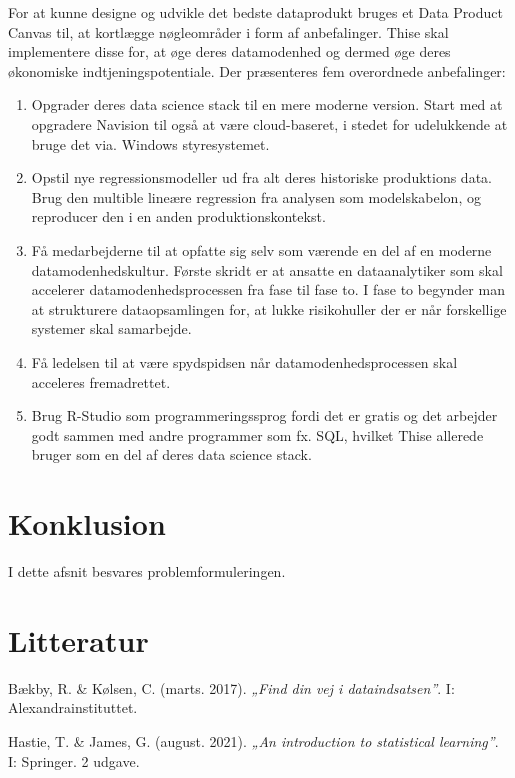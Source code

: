 \documentclass[
  12pt,
  a4paper,
  DIV=11,
  numbers=noendperiod,
  oneside,
  open=any]{scrartcl}
\providecommand{\tightlist}{%
  \setlength{\itemsep}{0pt}\setlength{\parskip}{0pt}}\usepackage{longtable,booktabs,array}
\begin{document}
For at kunne designe og udvikle det bedste dataprodukt bruges et Data
Product Canvas til, at kortlægge nøgleområder i form af anbefalinger.
Thise skal implementere disse for, at øge deres datamodenhed og dermed
øge deres økonomiske indtjeningspotentiale. Der præsenteres fem
overordnede anbefalinger:

\begin{enumerate}
\def\labelenumi{\arabic{enumi}.}
\tightlist
\item
  Opgrader deres data science stack til en mere moderne version. Start
  med at opgradere Navision til også at være cloud-baseret, i stedet for
  udelukkende at bruge det via. Windows styresystemet.
\item
  Opstil nye regressionsmodeller ud fra alt deres historiske produktions
  data. Brug den multible lineære regression fra analysen som
  modelskabelon, og reproducer den i en anden produktionskontekst.
\item
  Få medarbejderne til at opfatte sig selv som værende en del af en
  moderne datamodenhedskultur. Første skridt er at ansatte en
  dataanalytiker som skal accelerer datamodenhedsprocessen fra fase til
  fase to. I fase to begynder man at strukturere dataopsamlingen for, at
  lukke risikohuller der er når forskellige systemer skal samarbejde.
\item
  Få ledelsen til at være spydspidsen når datamodenhedsprocessen skal
  acceleres fremadrettet.
\item
  Brug R-Studio som programmeringssprog fordi det er gratis og det
  arbejder godt sammen med andre programmer som fx. SQL, hvilket Thise
  allerede bruger som en del af deres data science stack.
\end{enumerate}

\hypertarget{konklusion}{%
\section{Konklusion}\label{konklusion}}

I dette afsnit besvares problemformuleringen.

\hypertarget{litteratur}{%
\section{Litteratur}\label{litteratur}}

Bækby, R. \& Kølsen, C. (marts. 2017). \emph{„Find din vej i
dataindsatsen''}. I: Alexandrainstituttet.~

Hastie, T. \& James, G. (august. 2021). \emph{„An introduction to
statistical learning''}. I: Springer. 2 udgave. ~
\end{document}
